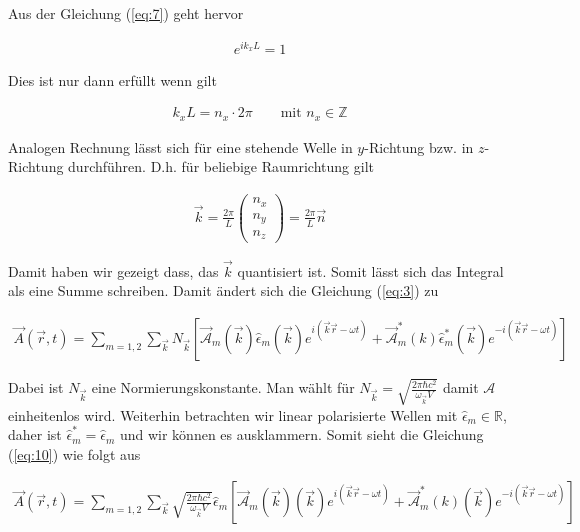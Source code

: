 Aus der Gleichung (\ref{eq:7}) geht hervor

\begin{align}
  \label{eq:6}
  e^{i k_x L} = 1
\end{align}

Dies ist nur dann erfüllt wenn gilt

\begin{align}
  \label{eq:8}
  k_x L = n_x\cdot 2\pi \qquad \text{mit }n_x\in \mathds Z
\end{align}

Analogen Rechnung lässt sich für eine stehende Welle in \(y\)-Richtung bzw. in \(z\)-Richtung durchführen. D.h. für beliebige Raumrichtung gilt

\begin{align}
  \label{eq:9}
  \vec k = \frac{2\pi}{L}
  \begin{pmatrix}
    n_x\\n_y\\n_z
  \end{pmatrix}
= \frac{2\pi}{L} \vec n
\end{align}

Damit haben wir gezeigt dass, das \(\vec k\) quantisiert ist. Somit lässt sich das Integral als eine Summe schreiben. Damit ändert sich die Gleichung (\ref{eq:3}) zu

\begin{align}
  \label{eq:10}
  \vec A(\vec r, t) =\sum_{m=1,2} \sum_{\vec k}  N_{\vec k} \left[  \vec{\mathcal A}_m (\vec k) \hat \epsilon_m (\vec k) e^{i(\vec k\vec r-\omega t)} + \vec{\mathcal A}^*_m (k)\hat\epsilon^*_m(\vec k) e^{-i(\vec k\vec r-\omega t)}\right]
\end{align}

Dabei ist \(N_{\vec k}\) eine Normierungskonstante. Man wählt für \(N_{\vec k}=\sqrt{\frac{2\pi\hbar c^2}{\omega_{\vec k}V}}\) damit \(\mathcal A\) einheitenlos wird.  Weiterhin betrachten wir linear polarisierte Wellen mit \(\hat \epsilon_m \in \mathds{R} \), daher ist \(\hat \epsilon_m^* = \hat \epsilon_m \) und wir können es ausklammern. Somit sieht die Gleichung (\ref{eq:10}) wie folgt aus

\begin{align}
  \label{eq:11}
    \vec A(\vec r, t) =  \sum_{m=1,2} \sum_{\vec k} \sqrt{\frac{2\pi\hbar c^2}{\omega_{\vec k}V}}  \hat \epsilon_m  \left[  \vec{\mathcal A}_m (\vec k) (\vec k) e^{i(\vec k\vec r-\omega t)} + \vec{\mathcal A}^*_m (k)(\vec k) e^{-i(\vec k\vec r-\omega t)}\right]
\end{align}


